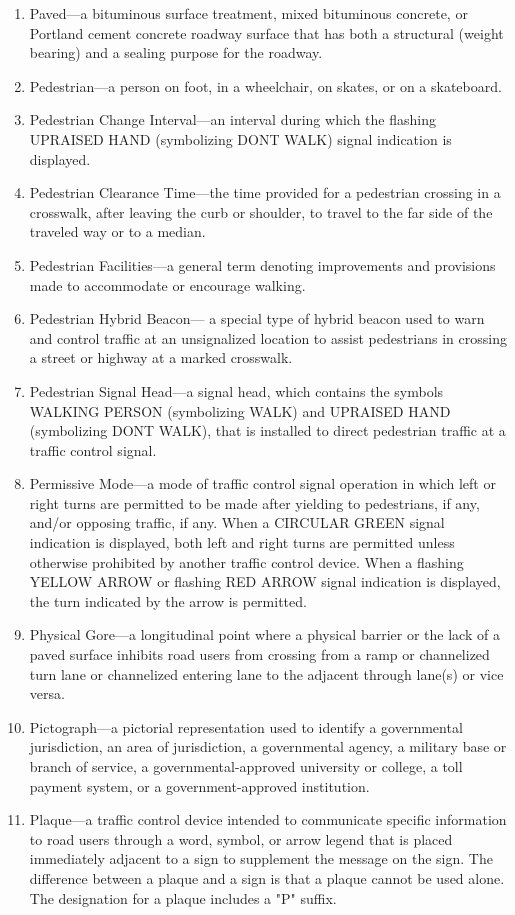 \documentclass[9pt]{memoir}
\begin{document}
{\begin{enumerate}[label=\arabic*., ref=\arabic*]
\item Paved---a bituminous surface treatment, mixed bituminous concrete, or Portland cement concrete roadway surface that has both a structural (weight bearing) and a sealing purpose for the roadway.
\item Pedestrian---a person on foot, in a wheelchair, on skates, or on a skateboard.
\item Pedestrian Change Interval---an interval during which the flashing UPRAISED HAND (symbolizing DONT WALK) signal indication is displayed.
\item Pedestrian Clearance Time---the time provided for a pedestrian crossing in a crosswalk, after leaving the curb or shoulder, to travel to the far side of the traveled way or to a median.
\item Pedestrian Facilities---a general term denoting improvements and provisions made to accommodate or encourage walking.
\item Pedestrian Hybrid Beacon--- a special type of hybrid beacon used to warn and control traffic at an unsignalized location to assist pedestrians in crossing a street or highway at a marked crosswalk.
\item Pedestrian Signal Head---a signal head, which contains the symbols WALKING PERSON (symbolizing WALK) and UPRAISED HAND (symbolizing DONT WALK), that is installed to direct pedestrian traffic at a traffic control signal.
\item Permissive Mode---a mode of traffic control signal operation in which left or right turns are permitted to be made after yielding to pedestrians, if any, and/or opposing traffic, if any. When a CIRCULAR GREEN signal indication is displayed, both left and right turns are permitted unless otherwise prohibited by another traffic control device. When a flashing YELLOW ARROW or flashing RED ARROW signal indication is displayed, the turn indicated by the arrow is permitted.
\item Physical Gore---a longitudinal point where a physical barrier or the lack of a paved surface inhibits road users from crossing from a ramp or channelized turn lane or channelized entering lane to the adjacent through lane(s) or vice versa.
\item Pictograph---a pictorial representation used to identify a governmental jurisdiction, an area of jurisdiction, a governmental agency, a military base or branch of service, a governmental-approved university or college, a toll payment system, or a government-approved institution.
\item Plaque---a traffic control device intended to communicate specific information to road users through a word, symbol, or arrow legend that is placed immediately adjacent to a sign to supplement the message on the sign. The difference between a plaque and a sign is that a plaque cannot be used alone. The designation for a plaque includes a "P" suffix.

\end{enumerate}}
\end{document}
